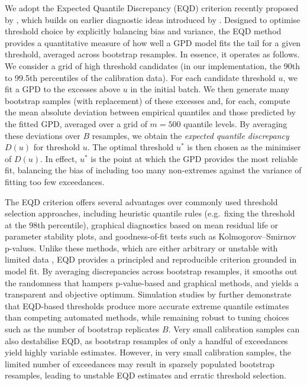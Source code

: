 \documentclass{statsmsc}
\begin{document}
We adopt the Expected Quantile Discrepancy (EQD) criterion recently proposed by \citet{murphy2025eqd}, 
which builds on earlier diagnostic ideas introduced by \citet{varty2021earthquake}. 
Designed to optimise threshold choice by explicitly balancing bias and variance, 
the EQD method provides a quantitative measure of how well a GPD model fits the tail for a given threshold, 
averaged across bootstrap resamples. In essence, it operates as follows. 
We consider a grid of high threshold candidates (in our implementation, the 90th to 99.5th percentiles of the calibration data). 
For each candidate threshold $u$, we fit a GPD to the excesses above $u$ in the initial batch. 
We then generate many bootstrap samples (with replacement) of these excesses and, for each, 
compute the mean absolute deviation between empirical quantiles and those predicted by the fitted GPD,
averaged over a grid of \(m=500\) quantile levels. By averaging these deviations over \(B\) resamples, 
we obtain the \emph{expected quantile discrepancy} $D(u)$ for threshold $u$. 
The optimal threshold $u^*$ is then chosen as the minimiser of $D(u)$. 
In effect, $u^*$ is the point at which the GPD provides the most reliable fit, 
balancing the bias of including too many non-extremes against the variance of fitting too few exceedances.

The EQD criterion offers several advantages over commonly used threshold selection approaches, 
including heuristic quantile rules (e.g.\ fixing the threshold at the 98th percentile), 
graphical diagnostics based on mean residual life or parameter stability plots, 
and goodness-of-fit tests such as Kolmogorov--Smirnov p-values\citep{Coles2001,DavisonSmith1990}.
Unlike these methods, which are either arbitrary or unstable with limited data \citep{NorthropJonathan2011}, 
EQD provides a principled and reproducible criterion grounded in model fit. 
By averaging discrepancies across bootstrap resamples, it smooths out the randomness that 
hampers p-value-based and graphical methods, and yields a transparent and objective optimum. 
Simulation studies by \citet{murphy2025eqd} further demonstrate that EQD-based thresholds produce
more accurate extreme quantile estimates than competing automated methods, 
while remaining robust to tuning choices such as the number of bootstrap replicates $B$. 
Very small calibration samples can also destabilise EQD, as bootstrap resamples of only a handful of exceedances yield 
highly variable estimates. However, in very small calibration samples, the limited number of exceedances may result in 
sparsely populated bootstrap resamples, leading to unstable EQD estimates and erratic threshold selection.
\end{document}
